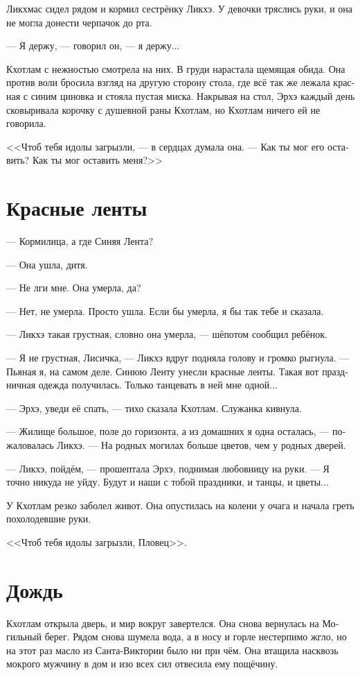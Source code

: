 \documentclass[a4paper,12pt,fleqn]{book}\usepackage{polyglossia}\setdefaultlanguage[babelshorthands=true]{russian}\setotherlanguage{english}\defaultfontfeatures{Ligatures=TeX,Mapping=tex-text}\usepackage{xcolor}\newcommand{\ml}[3]{#2}
\begin{document}
Ликхмас сидел рядом и кормил сестрёнку Ликхэ.
У девочки тряслись руки, и она не могла донести черпачок до рта.

--- Я держу, --- говорил он, --- я держу...

Кхотлам с нежностью смотрела на них.
В груди нарастала щемящая обида.
Она против воли бросила взгляд на другую сторону стола, где всё так же лежала красная с синим циновка и стояла пустая миска.
Накрывая на стол, Эрхэ каждый день сковыривала корочку с душевной раны Кхотлам, но Кхотлам ничего ей не говорила.

<<Чтоб тебя идолы загрызли, --- в сердцах думала она.
--- Как ты мог его оставить?
Как ты мог оставить меня?>>

\section{Красные ленты}

--- Кормилица, а где Синяя Лента?

--- Она ушла, дитя.

--- Не лги мне.
Она умерла, да?

--- Нет, не умерла.
Просто ушла.
Если бы умерла, я бы так тебе и сказала.

--- Ликхэ такая грустная, словно она умерла, --- шёпотом сообщил ребёнок.

--- Я не грустная, Лисичка, --- Ликхэ вдруг подняла голову и громко рыгнула.
--- Пьяная я, на самом деле.
Синюю Ленту унесли красные ленты.
Такая вот праздничная одежда получилась.
Только танцевать в ней мне одной...

--- Эрхэ, уведи её спать, --- тихо сказала Кхотлам.
Служанка кивнула.

--- Жилище большое, поле до горизонта, а из домашних я одна осталась, --- пожаловалась Ликхэ.
--- На родных могилах больше цветов, чем у родных дверей. 

--- Ликхэ, пойдём, --- прошептала Эрхэ, поднимая любовницу на руки.
--- Я точно никуда не уйду.
Будут и наши с тобой праздники, и танцы, и цветы...

У Кхотлам резко заболел живот.
Она опустилась на колени у очага и начала греть похолодевшие руки.

<<Чтоб тебя идолы загрызли, Пловец>>.

\section{Дождь}

Кхотлам открыла дверь, и мир вокруг завертелся.
Она снова вернулась на Могильный берег.
Рядом снова шумела вода, а в носу и горле нестерпимо жгло, но на этот раз масло из Санта-Виктории было ни при чём.
Она втащила насквозь мокрого мужчину в дом и изо всех сил отвесила ему пощёчину.
\end{document}
